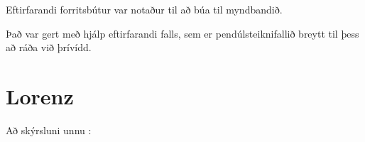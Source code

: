 \documentclass[a4]{article}
\begin{document}
 Eftirfarandi forritsbútur var notaður til að búa til myndbandið.

 Það var gert með hjálp eftirfarandi falls, sem er pendúlsteiknifallið breytt til þess að ráða við þrívídd.


\section{Lorenz}
\vspace{20 mm}
Að skýrsluni unnu :
\hspace{0.5cm} \makebox[1.5in]{\hrulefill}
\hspace{0.5cm} \makebox[1.5in]{\hrulefill}
\hspace{0.5cm} \makebox[1.5in]{\hrulefill}
\end{document}
